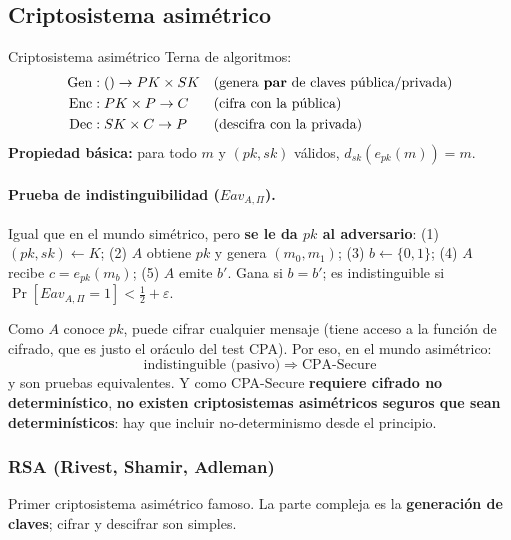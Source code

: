 \documentclass[../main.tex]{subfiles}
\begin{document}
\subsection{Criptosistema asimétrico}

\begin{definicion}{Criptosistema asimétrico}
Terna de algoritmos:
\begin{align*}
\mathrm{Gen}&: ()\to PK\times SK &&\text{(genera \textbf{par} de claves pública/privada)}\\
\mathrm{Enc}&: PK\times P\to C &&\text{(cifra con la pública)}\\
\mathrm{Dec}&: SK\times C\to P &&\text{(descifra con la privada)}
\end{align*}
\textbf{Propiedad básica:} para todo $m$ y $(pk,sk)$ válidos, $d_{sk}(e_{pk}(m))=m$.
\end{definicion}

\paragraph{Prueba de indistinguibilidad ($Eav_{A,\Pi}$).} Igual que en el mundo
simétrico, pero \textbf{se le da $pk$ al adversario}: (1) $(pk,sk)\leftarrow K$;
(2) $A$ obtiene $pk$ y genera $(m_0,m_1)$; (3) $b\leftarrow\{0,1\}$; (4) $A$ recibe
$c=e_{pk}(m_b)$; (5) $A$ emite $b'$. Gana si $b=b'$; es indistinguible si
$\Pr[Eav_{A,\Pi}=1]<\tfrac12+\varepsilon$.

\begin{destacado}
Como $A$ conoce $pk$, puede cifrar cualquier mensaje (tiene acceso a la función de
cifrado, que es justo el oráculo del test CPA). Por eso, en el mundo asimétrico:
\[ \text{indistinguible (pasivo)} \;\Rightarrow\; \text{CPA-Secure} \]
y son pruebas equivalentes. Y como CPA-Secure \textbf{requiere cifrado no
determinístico}, \textbf{no existen criptosistemas asimétricos seguros que sean
determinísticos}: hay que incluir no-determinismo desde el principio.
\end{destacado}

\subsubsection{RSA (Rivest, Shamir, Adleman)}

Primer criptosistema asimétrico famoso. La parte compleja es la \textbf{generación
de claves}; cifrar y descifrar son simples.
\end{document}
